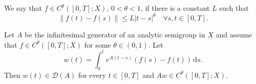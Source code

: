 \begin{Definition}
\label{def:banach-valued-holder-continuity}
We say that $f\in C^\theta([0,T];X)$, $0<\theta<1$, if there is a constant $L$ such that
\begin{equation}\label{eq:banach-valued-holder-continuity-definition}
\|f(t)-f(s)\|\leq L|t-s|^\theta\quad\forall s,t\in[0,T].
\end{equation}

\end{Definition}

\begin{Lemma}
\label{lem:analytic-holder-data-difference-convolution}
Let $A$ be the infinitesimal generator of an analytic semigroup in $X$ and assume that $f\in C^\theta([0,T];X)$ for some $\theta\in(0,1)$. Let
\begin{equation}\label{eq:analytic-semigroup-holder-data-difference-convolution}
w(t)=\int_0^t e^{A(t-s)}(f(s)-f(t))\,\mathrm{d}s.
\end{equation}
Then $w(t)\in\mathcal{D}(A)$ for every $t\in[0,T]$ and $Aw\in C^\theta([0,T];X)$.
\end{Lemma}

